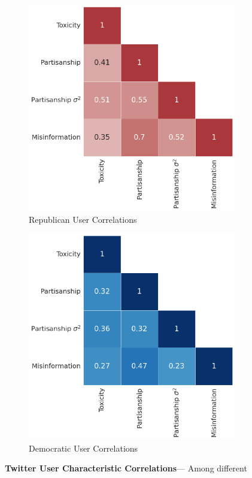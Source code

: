 \begin{figure}
\begin{subfigure}{.25\textwidth}
  \includegraphics[width=1\linewidth]{figures/republican-correlations.png}
  \caption{Republican User Correlations}
  \label{fig:twitter-reddit-partisanship}
\end{subfigure}
\hspace{20pt}
\begin{subfigure}{.25\textwidth}
  \centering
  \includegraphics[width=1\linewidth]{figures/democratic-correlations.png}
  \caption{Democratic User Correlations}
  \label{fig:twitter-reddit-toxicity-time}
\end{subfigure}
\caption{\textbf{Twitter User Characteristic Correlations}--- Among different 
}
\label{fig:twitter-correlations}
\end{figure}

